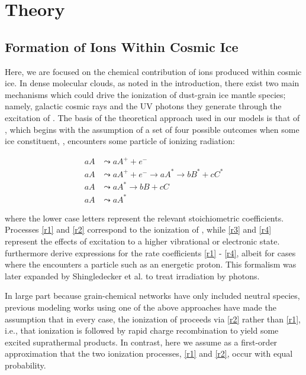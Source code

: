 \documentclass[journal=aesccq,manuscript=article,layout=twocolumn]{achemso}
\newcounter{ncounter}
\begin{document}
\section{Theory} \label{sec:theory}

\subsection{Formation of Ions Within Cosmic Ice}\label{sec:ionformation}

Here, we are focused on the chemical contribution of ions produced within cosmic ice. In dense molecular clouds, as noted in the introduction, there exist two main mechanisms which could drive the ionization of dust-grain ice mantle species; namely, galactic cosmic rays\citep{silsbee_magnetic_2018,ivlev_penetration_2018} and the UV photons they generate through the excitation of \citep{prasad_uv_1983}. The basis of the theoretical approach used in our models is that of \citet{shingledecker_general_2018}, which begins with the assumption of a set of four possible outcomes when some ice constituent, , encounters some particle of ionizing radiation:

\begin{align}
    aA &\leadsto{} aA^+ + e^- 
\tag{R1}
\label{r1}\\
aA &\leadsto{} aA^+ + e^- \rightarrow{} aA^* \rightarrow{} bB^* + cC^* 
\tag{R2}
\label{r2}\\
aA &\leadsto{} aA^* \rightarrow{} bB + cC 
\tag{R3}
\label{r3}\\
aA &\leadsto{} aA^*
\tag{R4}
\label{r4}
\end{align}


\noindent
where the lower case letters represent the relevant stoichiometric coefficients. Processes \eqref{r1} and \eqref{r2} correspond to the ionization of , while \eqref{r3} and \eqref{r4} represent the effects of excitation to a higher vibrational or electronic state. \citet{shingledecker_general_2018} furthermore derive expressions for the rate coefficients \eqref{r1} - \eqref{r4}, albeit for cases where the  encounters a particle such as an energetic proton. This formalism was later expanded by Shingledecker et al. \citep{mullikin_new_2021} to treat irradiation by photons. 

In large part because grain-chemical networks have only included neutral species, previous modeling works using one of the above approaches have made the assumption that in every case, the ionization of  proceeds via \eqref{r2} rather than \eqref{r1}, i.e., that ionization is followed by rapid charge recombination to yield some excited suprathermal products. In contrast, here we assume as a first-order approximation that the two ionization processes, \eqref{r1} and \eqref{r2}, occur with equal probability.
\end{document}

